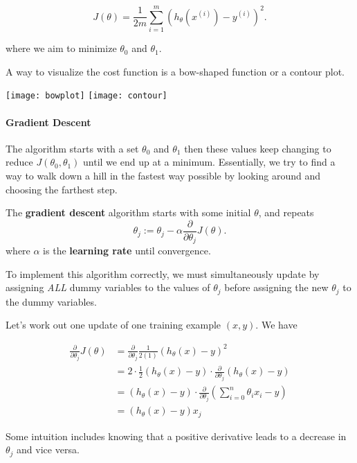 \documentclass{article}
\begin{document}
\begin{equation}
    \label{eq:cost_function}
    J(\theta) = \frac{1}{2m}\sum_{i=1}^{m}(h_\theta(x^{(i)}) - y^{(i)})^2.
\end{equation}

where we aim to minimize $\theta_{0}$ and $\theta_{1}$. 

A way to visualize the cost function is a bow-shaped function or a contour plot. 

\begin{center}
\texttt{[image: bowplot]}
\texttt{[image: contour]}
\end{center}

\paragraph{Gradient Descent}
The algorithm starts with a set $\theta_{0}$ and $\theta_{1}$ then these values keep changing to reduce $J\left( \theta_{0}, \theta_{1} \right)$ until we end up at a minimum. Essentially, we try to find a way to walk down a hill in the fastest way possible by looking around and choosing the farthest step.

The {\bf gradient descent} algorithm starts with some initial $\theta$, and repeats
\begin{equation}
	\theta_j := \theta_j - \alpha\frac{\partial}{\partial \theta_j}J(\theta).
\end{equation} 
where $\alpha$ is the {\bf learning rate} until convergence. 

To implement this algorithm correctly, we must simultaneously update by assigning {\it ALL} dummy variables to the values of $\theta_j$ before assigning the new $\theta_j$ to the dummy variables.

Let's work out one update of one training example $(x,y)$. We have

\begin{align*}
	\frac{\partial}{\partial\theta_j}J(\theta) &= \frac{\partial}{\partial\theta_j}\frac{1}{2(1)}(h_\theta(x)-y)^2 \\
	&= 2\cdot\frac{1}{2}(h_\theta(x)-y)\cdot\frac{\partial}{\partial\theta_j}(h_\theta(x)-y)\\
	&= (h_\theta(x)-y)\cdot\frac{\partial}{\partial\theta_j}\left(\sum_{i=0}^{n}\theta_ix_i-y\right) \\
	&= (h_\theta(x)-y)x_j
\end{align*}

Some intuition includes knowing that a positive derivative leads to a decrease in $\theta_j$ and vice versa.
\end{document}
